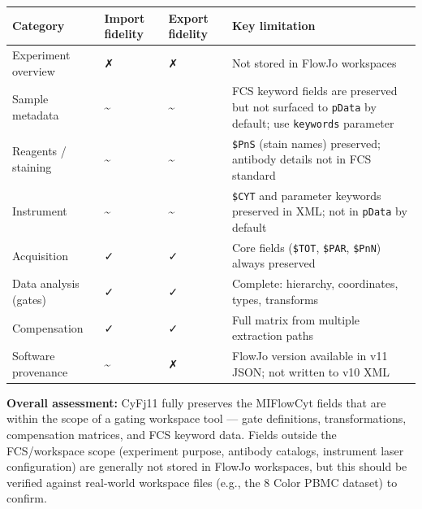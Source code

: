 \documentclass[
]{article}
\begin{document}
\begin{longtable}[]{@{}
  >{\raggedright\arraybackslash}p{}
  >{\raggedright\arraybackslash}p{}
  >{\raggedright\arraybackslash}p{}
  >{\raggedright\arraybackslash}p{}@{}}
\toprule\noalign{}
\begin{minipage}[b]{\linewidth}\raggedright
Category
\end{minipage} & \begin{minipage}[b]{\linewidth}\raggedright
Import fidelity
\end{minipage} & \begin{minipage}[b]{\linewidth}\raggedright
Export fidelity
\end{minipage} & \begin{minipage}[b]{\linewidth}\raggedright
Key limitation
\end{minipage} \\
\midrule\noalign{}
\endhead
\bottomrule\noalign{}
\endlastfoot
Experiment overview & ✗ & ✗ & Not stored in FlowJo workspaces \\
Sample metadata & \textasciitilde{} & \textasciitilde{} & FCS keyword
fields are preserved but not surfaced to \texttt{pData} by default; use
\texttt{keywords} parameter \\
Reagents / staining & \textasciitilde{} & \textasciitilde{} &
\texttt{\$PnS} (stain names) preserved; antibody details not in FCS
standard \\
Instrument & \textasciitilde{} & \textasciitilde{} & \texttt{\$CYT} and
parameter keywords preserved in XML; not in \texttt{pData} by default \\
Acquisition & ✓ & ✓ & Core fields (\texttt{\$TOT}, \texttt{\$PAR},
\texttt{\$PnN}) always preserved \\
Data analysis (gates) & ✓ & ✓ & Complete: hierarchy, coordinates, types,
transforms \\
Compensation & ✓ & ✓ & Full matrix from multiple extraction paths \\
Software provenance & \textasciitilde{} & ✗ & FlowJo version available
in v11 JSON; not written to v10 XML \\
\end{longtable}

\textbf{Overall assessment:} CyFj11 fully preserves the MIFlowCyt fields
that are within the scope of a gating workspace tool --- gate
definitions, transformations, compensation matrices, and FCS keyword
data.
\textcolor{pending}{Fields outside the FCS/workspace scope (experiment purpose, antibody catalogs, instrument laser configuration) are generally not stored in FlowJo workspaces, but this should be verified against real-world workspace files (e.g., the 8 Color PBMC dataset) to confirm.}
\end{document}
